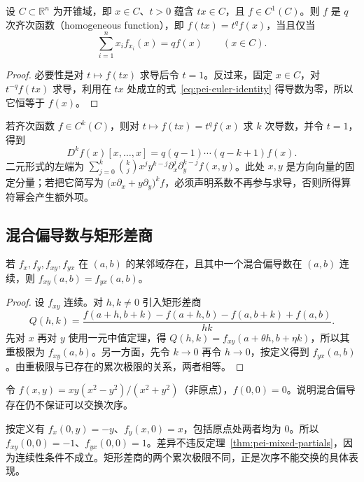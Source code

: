 \begin{proposition}
\label{prop:pei-euler-homogeneous}
设 $C\subset\mathbb R^n$ 为开锥域，即 $x\in C$、$t>0$ 蕴含 $tx\in C$，且 $f\in C^1(C)$。则 $f$ 是 $q$ 次齐次函数（homogeneous function），即 $f(tx)=t^qf(x)$，当且仅当
\begin{equation}
\label{eq:pei-euler-identity}
\sum_{i=1}^n x_i f_{x_i}(x)=qf(x)\qquad(x\in C).
\end{equation}
\end{proposition}
\begin{proof}
必要性是对 $t\mapsto f(tx)$ 求导后令 $t=1$。反过来，固定 $x\in C$，对 $t^{-q}f(tx)$ 求导，利用在 $tx$ 处成立的式~\eqref{eq:pei-euler-identity} 得导数为零，所以它恒等于 $f(x)$。
\end{proof}

若齐次函数 $f\in C^k(C)$，则对 $t\mapsto f(tx)=t^qf(x)$ 求 $k$ 次导数，并令 $t=1$，得到
\[
D^kf(x)[x,\ldots,x]=q(q-1)\cdots(q-k+1)f(x).
\]
二元形式的左端为 $\sum_{j=0}^k\binom{k}{j}x^jy^{k-j}\partial_x^j\partial_y^{k-j}f(x,y)$。此处 $x,y$ 是方向向量的固定分量；若把它简写为 $\bigl(x\partial_x+y\partial_y\bigr)^kf$，必须声明系数不再参与求导，否则所得算符幂会产生额外项。

\subsection{混合偏导数与矩形差商}

\begin{theorem}
\label{thm:pei-mixed-partials}
若 $f_x,f_y,f_{xy},f_{yx}$ 在 $(a,b)$ 的某邻域存在，且其中一个混合偏导数在 $(a,b)$ 连续，则 $f_{xy}(a,b)=f_{yx}(a,b)$。
\end{theorem}
\begin{proof}
设 $f_{xy}$ 连续。对 $h,k\ne0$ 引入矩形差商
\[
Q(h,k)=\frac{f(a+h,b+k)-f(a+h,b)-f(a,b+k)+f(a,b)}{hk}.
\]
先对 $x$ 再对 $y$ 使用一元中值定理，得 $Q(h,k)=f_{xy}(a+\theta h,b+\eta k)$，所以其重极限为 $f_{xy}(a,b)$。另一方面，先令 $k\to0$ 再令 $h\to0$，按定义得到 $f_{yx}(a,b)$。由重极限与已存在的累次极限的关系，两者相等。
\end{proof}

\begin{example}
令 $f(x,y)=xy(x^2-y^2)/(x^2+y^2)$（非原点），$f(0,0)=0$。说明混合偏导存在仍不保证可以交换次序。
\end{example}
\begin{solve}
按定义有 $f_x(0,y)=-y$、$f_y(x,0)=x$，包括原点处两者均为 $0$。所以 $f_{xy}(0,0)=-1$、$f_{yx}(0,0)=1$。差异不违反定理~\ref{thm:pei-mixed-partials}，因为连续性条件不成立。矩形差商的两个累次极限不同，正是次序不能交换的具体表现。
\end{solve}

